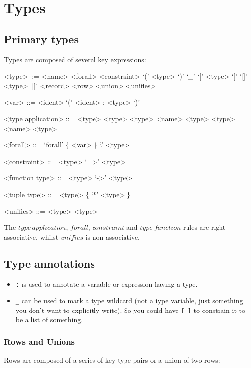 \section{Types}

\subsection{Primary types}
Types are composed of several key expressions:

\begin{grammar}
<type> ::= <name>
      \alt <forall>
      \alt <constraint>
      \alt `(' <type> `)'
      \alt `_'
      \alt `[' <type> `]'
      \alt `[|' <type> `|]'
      \alt <record>
      \alt <row>
      \alt <union>
      \alt <unifies>

<var> ::= <ident>
     \alt `(' <ident> : <type> `)'

<type application> ::= <type> <type>
                  \alt <type> <name> <type>
                  \alt <type> \lit{\`{}} <name> \lit{\`{}} <type>

<forall>        ::= `forall' \{ <var> \} `.' <type>

<constraint>    ::= <type> `=>' <type>

<function type> ::= <type> `->' <type>

<tuple type>    ::= <type> \{ `*' <type> \}

<unifies>       ::= <type> \lit{$\sim$} <type>
\end{grammar}
The $type\ application$, $forall$, $constraint$ and $type\ function$ rules are right associative, whilst $unifies$ is non-associative.


\subsection{Type annotations}
\begin{itemize}
\item \texttt{:} is used to annotate a variable or expression having a type.
\item \texttt{\_} can be used to mark a type wildcard (not a type variable, just something you don’t want to explicitly write). So you could have \texttt{[\_]} to constrain it to be a list of something.
\end{itemize}

\subsubsection{Rows and Unions}
Rows are composed of a series of key-type pairs or a union of two rows:

